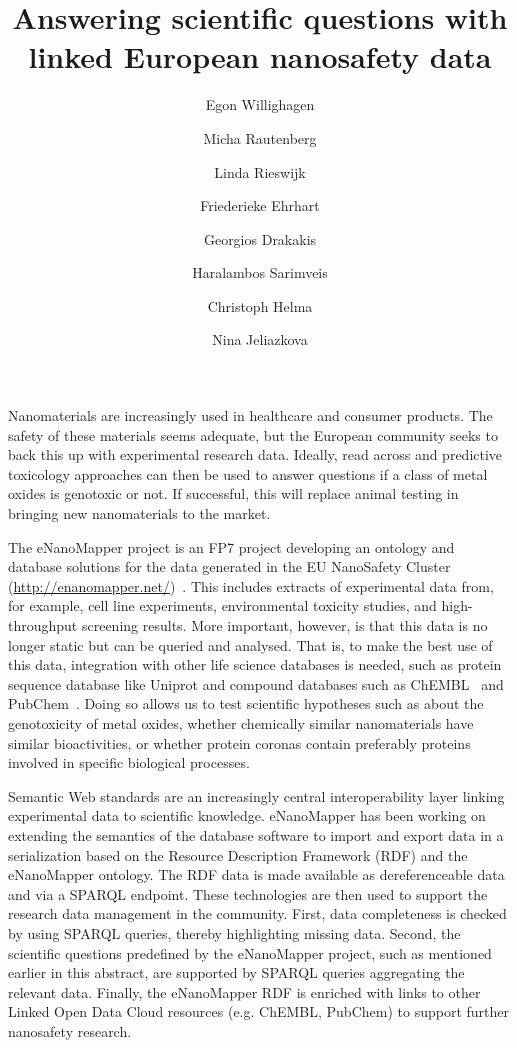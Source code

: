 \documentclass{llncs}
\begin{document}
\title{Answering scientific questions with linked European nanosafety data}

\author{
  Egon Willighagen \and
  Micha Rautenberg \and
  Linda Rieswijk \and
  Friederieke Ehrhart \and
  Georgios Drakakis \and
  Haralambos Sarimveis \and
  Christoph Helma \and
  Nina Jeliazkova
}


\maketitle

Nanomaterials are increasingly used in healthcare and consumer products. The 
safety of these materials seems adequate, but the European community seeks to 
back this up with experimental research data. Ideally, read across and 
predictive toxicology approaches can then be used to answer questions if a class 
of metal oxides is genotoxic or not. If successful, this will replace animal 
testing in bringing new nanomaterials to the market.

The eNanoMapper project is an FP7 project developing an ontology and database 
solutions for the data generated in the EU NanoSafety
Cluster (\url{http://enanomapper.net/})~\cite{Hastings2015,Jeliazkova2015}. This 
includes extracts of experimental data from, for example, cell line experiments, 
environmental toxicity studies, and high-throughput screening results. More 
important, however, is that this data is no longer static but can be queried and 
analysed. That is, to make the best use of this data, integration with other 
life science databases is needed, such as protein sequence database like Uniprot 
and compound databases such as ChEMBL~\cite{Willighagen2013} and
PubChem~\cite{Fu2015}. Doing so allows us to 
test scientific hypotheses such as about the genotoxicity of metal oxides, 
whether chemically similar nanomaterials have similar bioactivities, or whether 
protein coronas contain preferably proteins involved in specific biological 
processes.

Semantic Web standards are an increasingly central interoperability layer 
linking experimental data to scientific knowledge. eNanoMapper has been working 
on extending the semantics of the database software to import and export data in 
a serialization based on the Resource Description Framework (RDF) and the 
eNanoMapper ontology. The RDF data is made available as dereferenceable data and 
via a SPARQL endpoint. These technologies are then used to support the research 
data management in the community. First, data completeness is checked by 
using SPARQL queries, thereby highlighting missing data. Second, the scientific 
questions predefined by the eNanoMapper project, such as mentioned earlier in 
this abstract, are supported by SPARQL queries aggregating the relevant data. 
Finally, the eNanoMapper RDF is enriched with links to other Linked Open Data 
Cloud resources (e.g. ChEMBL, PubChem) to support further nanosafety research.

{}

\end{document}
